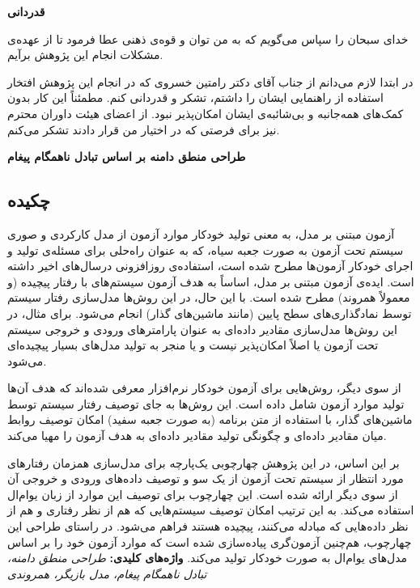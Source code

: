 \documentclass[twoside, a4paper,11pt]{book}
\numberwithin{equation}{chapter}
\numberwithin{table}{chapter}
\numberwithin{figure}{chapter}
\numberwithin{equation}{chapter}
\begin{document}
\newpage
\thispagestyle{empty}
\mbox{}

\newpage
\thispagestyle{empty}
\begin{center}
\large{\bfseries{قدردانی}}\\
\end{center}
خدای سبحان را سپاس می‌گویم که به من توان و قوه‌ی ذهنی عطا فرمود تا از عهده‌ی مشکلات انجام این پژوهش برآیم.
 
‎در ابتدا لازم می‌دانم از جناب آقای دکتر رامتین خسروی که در انجام این پژوهش  افتخار استفاده از راهنمایی ایشان را داشتم، تشکر و قدردانی کنم. مطمئناً این کار بدون کمک‌های همه‌جانبه و بی‌شائبه‌ی ایشان امکان‌پذیر نبود. از اعضای هیئت داوران محترم نیز برای فرصتی که در اختیار من قرار دادند تشکر می‌کنم.

\newpage
\thispagestyle{empty}
\mbox{}


\pagestyle{plain}

\newpage
{\centering\large{\bf{طراحی منطق دامنه بر اساس تبادل ناهمگام پیغام}} \par}
\subsection*{چکیده}
آزمون مبتنی بر مدل، به معنی تولید خودکار موارد آزمون از مدل کارکردی و صوری سیستم تحت آزمون به صورت جعبه سیاه، که به عنوان راه‌حلی برای مسئله‌ی تولید و اجرای خودکار آزمون‌ها مطرح شده است، استفاده‌ی روزافزونی درسال‌های اخیر داشته است. ایده‌ی آزمون مبتنی بر مدل، اساساً به هدف آزمون سیستم‌های با رفتار پیچیده (و معمولاً همروند) مطرح شده است. با این حال، در این روش‌ها مدل‌سازی رفتار سیستم توسط نمادگذاری‌های سطح پایین (مانند ماشین‌های گذار) انجام می‌شود. برای مثال، در این روش‌ها مدل‌سازی مقادیر داده‌ای به عنوان پارامترهای ورودی و خروجی سیستم تحت آزمون یا اصلاً امکان‌پذیر نیست و یا منجر به تولید مدل‌های بسیار پیچیده‌ای می‌شود.

از سوی دیگر، روش‌هایی برای آزمون خودکار نرم‌افزار معرفی شده‌اند که هدف آن‌ها تولید موارد آزمون شامل داده است. این روش‌ها به جای توصیف رفتار سیستم توسط ماشین‌های گذار، با استفاده از متن برنامه (به صورت جعبه سفید) امکان توصیف روابط میان مقادیر داده‌ای و چگونگی تولید مقادیر داده‌ای  به هدف آزمون را مهیا می‌کند.

بر این اساس، در این پژوهش چهارچوبی یک‌پارچه برای مدل‌سازی همزمان رفتارهای مورد انتظار از سیستم تحت آزمون از یک سو و توصیف داده‌های ورودی و خروجی آن از سوی دیگر ارائه شده است. این چهارچوب برای توصیف این موارد از زبان یو‌ام‌ال استفاده می‌کند. به این ترتیب امکان توصیف سیستم‌هایی که هم از نظر رفتاری و هم از نظر داده‌هایی که مبادله می‌کنند، پیچیده هستند فراهم می‌شود. در راستای طراحی این چهارچوب، هم‌چنین آزمون‌گری پیاده‌سازی شده است که موارد آزمون خود را بر اساس مدل‌های یو‌ام‌ال به صورت خودکار تولید می‌کند.
\textbf{واژه‌های کلیدی: }\textit{ طراحی منطق دامنه، تبادل ناهمگام پیغام، مدل بازیگر، همروندی}
\end{document}
